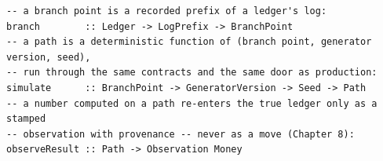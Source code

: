 \begin{lstlisting}
-- a branch point is a recorded prefix of a ledger's log:
branch        :: Ledger -> LogPrefix -> BranchPoint
-- a path is a deterministic function of (branch point, generator version, seed),
-- run through the same contracts and the same door as production:
simulate      :: BranchPoint -> GeneratorVersion -> Seed -> Path
-- a number computed on a path re-enters the true ledger only as a stamped
-- observation with provenance -- never as a move (Chapter 8):
observeResult :: Path -> Observation Money
\end{lstlisting}
